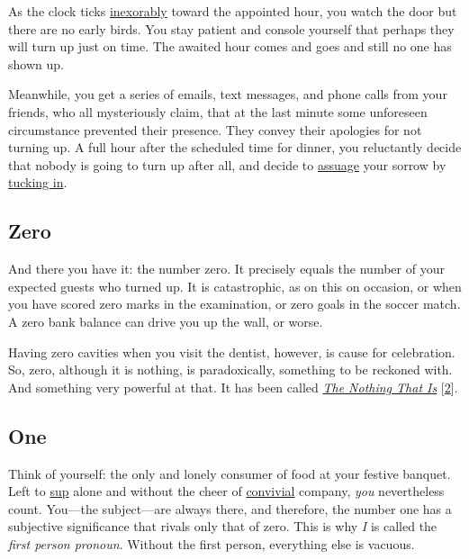 \documentclass[
  a4paper,
]{article}
\begin{document}
As the clock ticks
\href{https://www.thefreedictionary.com/inexorably}{inexorably} toward
the appointed hour, you watch the door but there are no early birds. You
stay patient and console yourself that perhaps they will turn up just on
time. The awaited hour comes and goes and still no one has shown up.

Meanwhile, you get a series of emails, text messages, and phone calls
from your friends, who all mysteriously claim, that at the last minute
some unforeseen circumstance prevented their presence. They convey their
apologies for not turning up. A full hour after the scheduled time for
dinner, you reluctantly decide that nobody is going to turn up after
all, and decide to
\href{https://www.merriam-webster.com/dictionary/assuage}{assuage} your
sorrow by
\href{https://www.oxfordlearnersdictionaries.com/definition/english/tuck-in}{tucking
in}.

\hypertarget{zero}{%
\subsection{Zero}\label{zero}}

And there you have it: the number zero. It precisely equals the number
of your expected guests who turned up. It is catastrophic, as on this on
occasion, or when you have scored zero marks in the examination, or zero
goals in the soccer match. A zero bank balance can drive you up the
wall, or worse.

Having zero cavities when you visit the dentist, however, is cause for
celebration. So, zero, although it is nothing, is paradoxically,
something to be reckoned with. And something very powerful at that. It
has been called
\href{https://www.amazon.in/Nothing-That-Natural-History-Zero/dp/0195142373}{\emph{The
Nothing That Is}} {[}\protect\hyperlink{ref-zero2000}{2}{]}.

\hypertarget{one}{%
\subsection{One}\label{one}}

Think of yourself: the only and lonely consumer of food at your festive
banquet. Left to \href{https://www.thefreedictionary.com/sup}{sup} alone
and without the cheer of
\href{https://www.dictionary.com/browse/convivial}{convivial} company,
\emph{you} nevertheless count. You---the subject---are always there, and
therefore, the number one has a subjective significance that rivals only
that of zero. This is why \emph{I} is called the \emph{first person
pronoun}. Without the first person, everything else is vacuous.
\end{document}
